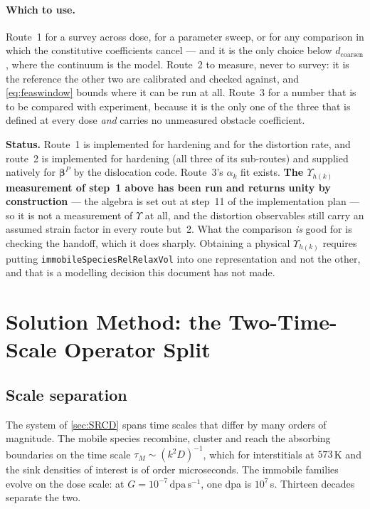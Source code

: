 \documentclass{article}
\newcommand{\code}[1]{\texttt{#1}}
\begin{document}
\paragraph{Which to use.} Route~1 for a survey across dose, for a parameter
sweep, or for any comparison in which the constitutive coefficients cancel ---
and it is the only choice below $d_{\mathrm{coarsen}}$, where the continuum is
the model. Route~2 to measure, never to survey: it is the reference the other two
are calibrated and checked against, and \cref{eq:feaswindow} bounds where it can
be run at all. Route~3 for a number that is to be compared with experiment,
because it is the only one of the three that is defined at every dose \emph{and}
carries no unmeasured obstacle coefficient.

\textbf{Status.} Route~1 is implemented for hardening and for the distortion
rate, and route~2 is implemented for hardening (all three of its sub-routes) and
supplied natively for $\bm\beta^{P}$ by the dislocation code. Route~3's
$\alpha_k$ fit exists. \textbf{The $\Upsilon_{h(k)}$ measurement of step~1 above
has been run and returns unity by construction} --- the algebra is set out at
step~11 of the implementation plan --- so it is not a measurement of
$\Upsilon$ at all, and the distortion observables still carry an assumed strain
factor in every route but~2. What the comparison \emph{is} good for is checking
the handoff, which it does sharply. Obtaining a physical $\Upsilon_{h(k)}$
requires putting \code{immobileSpeciesRelRelaxVol} into one representation and
not the other, and that is a modelling decision this document has not made.

\section{Solution Method: the Two-Time-Scale Operator Split}
\label{sec:solution}

\subsection{Scale separation}
\label{sec:scales}

The system of \cref{sec:SRCD} spans time scales that differ by many orders of
magnitude. The mobile species recombine, cluster and reach the absorbing
boundaries on the time scale $\tau_M\sim(k^2D)^{-1}$, which for interstitials at
$573\,$K and the sink densities of interest is of order microseconds. The
immobile families evolve on the dose scale: at $G=10^{-7}\,\mathrm{dpa\,s^{-1}}$,
one dpa is $10^{7}\,$s. Thirteen decades separate the two.
\end{document}
